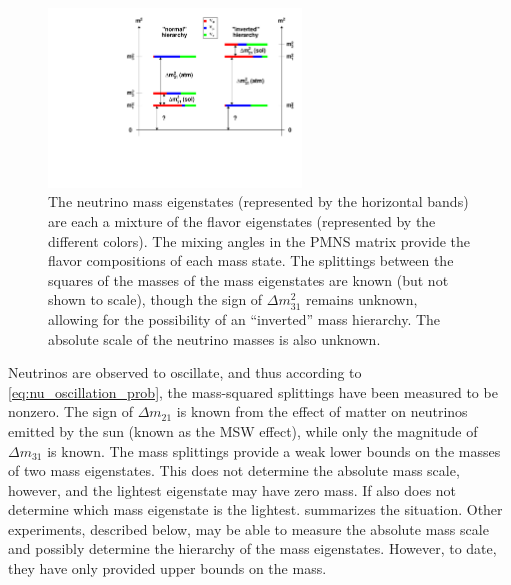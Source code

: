 \documentclass[herrin-thesis.tex]{subfiles}
\begin{document}
\begin{figure}
	\centering
	\includegraphics[width=0.6\textwidth]{./plots/nu_mixing.pdf}
	\caption[Neutrino mixing]{The neutrino mass eigenstates (represented by the horizontal bands) are each a mixture of the flavor eigenstates (represented by the different colors). The mixing angles in the PMNS matrix provide the flavor compositions of each mass state. The splittings between the squares of the masses of the mass eigenstates are known (but not shown to scale), though the sign of \(\Delta m_{31}^2\) remains unknown, allowing for the possibility of an ``inverted'' mass hierarchy. The absolute scale of the neutrino masses is also unknown.}
	\label{fig:nu_mixing}
\end{figure}

Neutrinos are observed to oscillate, and thus according to \cref{eq:nu_oscillation_prob}, the mass-squared splittings have been measured to be nonzero. The sign of \(\Delta m_{21}\) is known from the effect of matter on neutrinos emitted by the sun (known as the MSW effect), while only the magnitude of \(\Delta m_{31}\) is known. The mass splittings provide a weak lower bounds on the masses of two mass eigenstates. This does not determine the absolute mass scale, however, and the lightest eigenstate may have zero mass. If also does not determine which mass eigenstate is the lightest.  summarizes the situation. Other experiments, described below, may be able to measure the absolute mass scale and possibly determine the hierarchy of the mass eigenstates. However, to date, they have only provided upper bounds on the mass.
\end{document}
